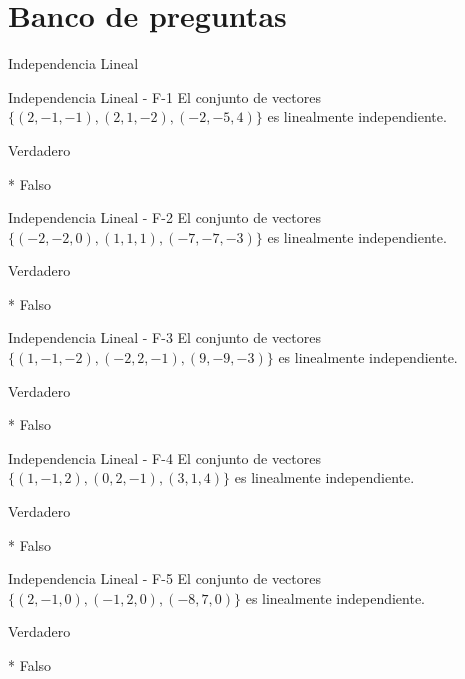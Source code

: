 \documentclass[a4,11pt]{aleph-notas}
\begin{document}
\section{Banco de preguntas}

\begin{quiz}{Independencia Lineal}

\begin{multi}[numbering = none, shuffle = false]%
    {Independencia Lineal - F-1}
    El conjunto de vectores $\{ (2,-1,-1) , (2,1,-2), (-2, -5, 4) \}$ es linealmente independiente.
    \item[] Verdadero 
    \item[]* Falso
\end{multi}

\begin{multi}[numbering = none, shuffle = false]%
    {Independencia Lineal - F-2}
    El conjunto de vectores $\{ (-2,-2,0) , (1,1,1), (-7, -7, -3) \}$ es linealmente independiente.
    \item[] Verdadero 
    \item[]* Falso
\end{multi}

\begin{multi}[numbering = none, shuffle = false]%
    {Independencia Lineal - F-3}
    El conjunto de vectores $\{ (1,-1,-2) , (-2,2,-1), (9, -9, -3) \}$ es linealmente independiente.
    \item[] Verdadero 
    \item[]* Falso
\end{multi}

\begin{multi}[numbering = none, shuffle = false]%
    {Independencia Lineal - F-4}
    El conjunto de vectores $\{ (1,-1,2) , (0,2,-1), (3, 1, 4) \}$ es linealmente independiente.
    \item[] Verdadero 
    \item[]* Falso
\end{multi}

\begin{multi}[numbering = none, shuffle = false]%
    {Independencia Lineal - F-5}
    El conjunto de vectores $\{ (2,-1,0) , (-1,2,0), (-8, 7, 0) \}$ es linealmente independiente.
    \item[] Verdadero 
    \item[]* Falso
\end{multi}


\end{quiz}
\end{document}
